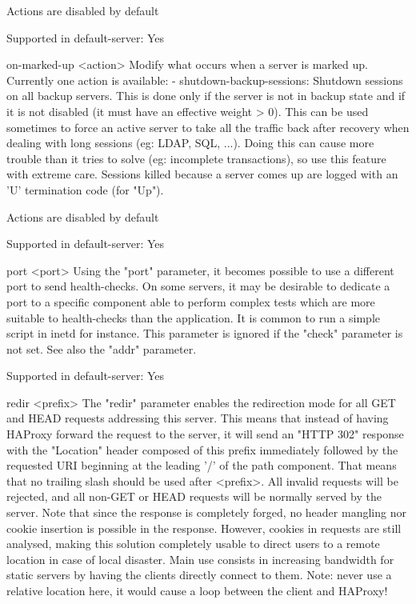  Actions are disabled by default

  Supported in default-server: Yes

on-marked-up <action>
  Modify what occurs when a server is marked up.
  Currently one action is available:
  - shutdown-backup-sessions: Shutdown sessions on all backup servers. This is
    done only if the server is not in backup state and if it is not disabled
    (it must have an effective weight > 0). This can be used sometimes to force
    an active server to take all the traffic back after recovery when dealing
    with long sessions (eg: LDAP, SQL, ...). Doing this can cause more trouble
    than it tries to solve (eg: incomplete transactions), so use this feature
    with extreme care. Sessions killed because a server comes up are logged
    with an 'U' termination code (for "Up").

  Actions are disabled by default

  Supported in default-server: Yes

port <port>
  Using the "port" parameter, it becomes possible to use a different port to
  send health-checks. On some servers, it may be desirable to dedicate a port
  to a specific component able to perform complex tests which are more suitable
  to health-checks than the application. It is common to run a simple script in
  inetd for instance. This parameter is ignored if the "check" parameter is not
  set. See also the "addr" parameter.

  Supported in default-server: Yes

redir <prefix>
  The "redir" parameter enables the redirection mode for all GET and HEAD
  requests addressing this server. This means that instead of having HAProxy
  forward the request to the server, it will send an "HTTP 302" response with
  the "Location" header composed of this prefix immediately followed by the
  requested URI beginning at the leading '/' of the path component. That means
  that no trailing slash should be used after <prefix>. All invalid requests
  will be rejected, and all non-GET or HEAD requests will be normally served by
  the server. Note that since the response is completely forged, no header
  mangling nor cookie insertion is possible in the response. However, cookies in
  requests are still analysed, making this solution completely usable to direct
  users to a remote location in case of local disaster. Main use consists in
  increasing bandwidth for static servers by having the clients directly
  connect to them. Note: never use a relative location here, it would cause a
  loop between the client and HAProxy!

